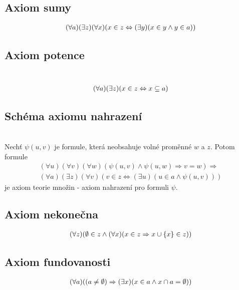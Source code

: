 \documentclass[a4paper,12pt,titlepage]{article}
\begin{document}
\subsection{Axiom sumy}
\setcounter{equation}{0}
\begin{align}
	(\forall a) (\exists z) (\forall x) (x \in z \Leftrightarrow (\exists y)(x \in y \land y 
	\in a))
\end{align}
\label{axiom-potence}
\subsection{Axiom potence}
\setcounter{equation}{0}
\\
\begin{align}
	(\forall a)(\exists z)(x \in z \Leftrightarrow x \subseteq a)
\end{align}
\label{schema-axiomu-nahrazeni}
\subsection{Schéma axiomu nahrazení}
\setcounter{equation}{0}
\\
Nechť $\psi(u,v)$ je formule, která neobsahuje volné proměnné $w$ a $z$. Potom 
formule
\begin{align}
	\label{axiom-nahrazeni-predpoklad}
	(\forall u)(\forall v)(\forall w) ( \psi(u,v) \land \psi(u,w) \Rightarrow
	v=w) \Rightarrow \\
	(\forall a) (\exists z) (\forall v) (v \in z \Leftrightarrow (\exists u)(u
	\in a \land \psi(u,v)))
\end{align}
je axiom teorie množin - axiom nahrazení pro formuli $\psi$.
\label{axiom-nekonecna}
\subsection{Axiom nekonečna}
\setcounter{equation}{0}
\begin{align}
	(\forall z)(\emptyset \in z \land (\forall x) (x \in z \Rightarrow x \cup \{x\}\in 
	z))
\end{align}
\label{axiom-fundovanosti}
\subsection{Axiom fundovanosti}
\setcounter{equation}{0}
\begin{align}
	(\forall a) ( (a \ne \emptyset) \Rightarrow (\exists x) (x \in a \land x \cap a = 
	\emptyset))
\end{align}
\end{document}
